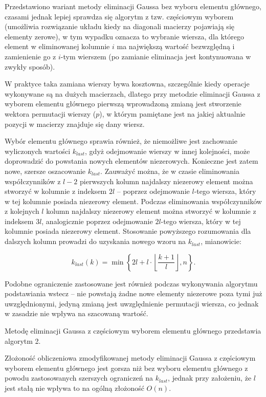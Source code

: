 \documentclass[12pt]{article}
\begin{document}
Przedstawiono wariant metody eliminacji Gaussa bez wyboru elementu głównego, czasami jednak lepiej sprawdza się algorytm z tzw. częściowym wyborem (umożliwia rozwiązanie układu kiedy na diagonali macierzy pojawiają się elementy zerowe), w tym wypadku oznacza to wybranie wiersza, dla którego element w eliminowanej kolumnie $i$ ma największą wartość bezwzględną i zamienienie go z $i$-tym wierszem (po zamianie eliminacja jest kontynuowana w zwykły sposób).

W praktyce taka zamiana wierszy bywa kosztowna, szczególnie kiedy operacje wykonywane są na dużych macierzach, dlatego przy metodzie eliminacji Gaussa z wyborem elementu głównego pierwszą wprowadzoną zmianą jest stworzenie wektora permutacji wierszy ($p$), w którym pamiętane jest na jakiej aktualnie pozycji w macierzy znajduje się dany wiersz.

Wybór elementu głównego sprawia również, że niemożliwe jest zachowanie wyliczonych wartości $k_{last}$, gdyż odejmowanie wierszy w innej kolejności, może doprowadzić do powstania nowych elementów niezerowych. Konieczne jest zatem nowe, szersze oszacowanie $k_{last}$. Zauważyć można, że w czasie eliminowania współczynników z $l - 2$ pierwszych kolumn najdalszy niezerowy element można stworzyć w kolumnie z indeksem $2l$ -- poprzez odejmowanie $l$-tego wiersza, który w tej kolumnie posiada niezerowy element. Podczas eliminowania współczynników z kolejnych $l$ kolumn  najdalszy niezerowy element można stworzyć w kolumnie z indeksem $3l$, analogicznie poprzez odejmowanie $2l$-tego wiersza, który w tej kolumnie posiada niezerowy element. Stosowanie powyższego rozumowania dla dalszych kolumn prowadzi do uzyskania nowego wzoru na $k_{last}$, mianowicie:  

\begin{equation}
k_{last}(k) = \min\left\lbrace2l + l \cdot \left \lfloor\frac{k + 1}{l}\right \rfloor, n\right\rbrace.
\label{eq:max_col_piv}
\end{equation}

Podobne ograniczenie zastosowane jest również podczas wykonywania algorytmu podstawiania wstecz -- nie powstają żadne nowe elementy niezerowe poza tymi już uwzględnionymi, jedyną zmianą jest uwzględnienie permutacji wiersza, co jednak w zasadzie nie wpływa na szacowaną wartość.

Metodę eliminacji Gaussa z częściowym wyborem elementu głównego przedstawia algorytm 2.

Złożoność obliczeniowa zmodyfikowanej metody eliminacji Gaussa z częściowym wyborem elementu głównego jest gorsza niż bez wyboru elementu głównego z powodu zastosowanych szerszych ograniczeń na $k_{last}$, jednak przy założeniu, że $l$ jest stałą nie wpływa to na ogólną złożoność $O(n)$.
\end{document}
